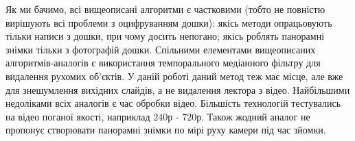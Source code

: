 \chapterConclusion

Як ми бачимо, всі вищеописані алгоритми є частковими (тобто не повністю вирішують всі проблеми
з оцифруванням дошки): якісь методи опрацьовують тільки написи з дошки, 
при чому досить непогано; якісь роблять панорамні знімки тільки з фотографій дошки.
Спільними елементами вищеописаних алгоритмів-аналогів є використання 
темпорального медіанного фільтру для видалення рухомих об'єктів.
У даній роботі даний метод теж має місце, але вже для знешумлення
вихідних слайдів, а не видалення лектора з відео.
Найбільшими недоліками всіх аналогів є час обробки відео. Більшість технологій
тестувались на відео поганої якості, наприклад 240р - 720р. 
Також жодний аналог не пропонує створювати панорамні знімки по мірі руху камери під
час зйомки.